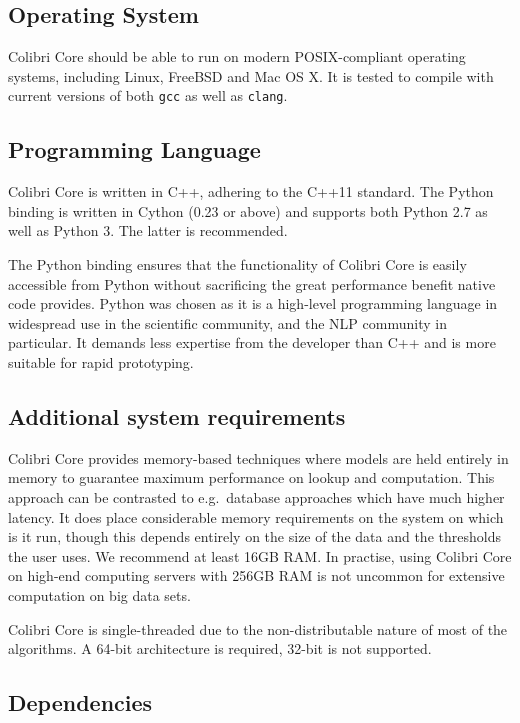 \subsection*{Operating System}

Colibri Core should be able to run on modern POSIX-compliant operating systems, including
Linux, FreeBSD and Mac OS X. It is tested to compile with current versions of
both \texttt{gcc} as well as \texttt{clang}.

\subsection*{Programming Language}

Colibri Core is written in C++, adhering to the C++11 standard. The Python
binding is written in Cython (0.23 or above) and supports both Python 2.7 as
well as Python 3. The latter is recommended.

The Python binding ensures that the functionality of Colibri Core is easily
accessible from Python without sacrificing the great performance benefit native
code provides. Python was chosen as it is a high-level programming language in
widespread use in the scientific community, and the NLP community in
particular. It demands less expertise from the developer than C++ and is more
suitable for rapid prototyping.

\subsection*{Additional system requirements}

Colibri Core provides memory-based techniques where models are held entirely in
memory to guarantee maximum performance on lookup and computation.  This
approach can be contrasted to e.g.\ database approaches which have much higher
latency.  It does place considerable memory requirements on the system on which
is it run, though this depends entirely on the size of the data and the
thresholds the user uses. We recommend at least 16GB RAM. In practise, using Colibri
Core on high-end computing servers with 256GB RAM is not uncommon for extensive
computation on big data sets.

Colibri Core is single-threaded due to the non-distributable nature of most of the
algorithms. A 64-bit architecture is required, 32-bit is not supported.

\subsection*{Dependencies}

